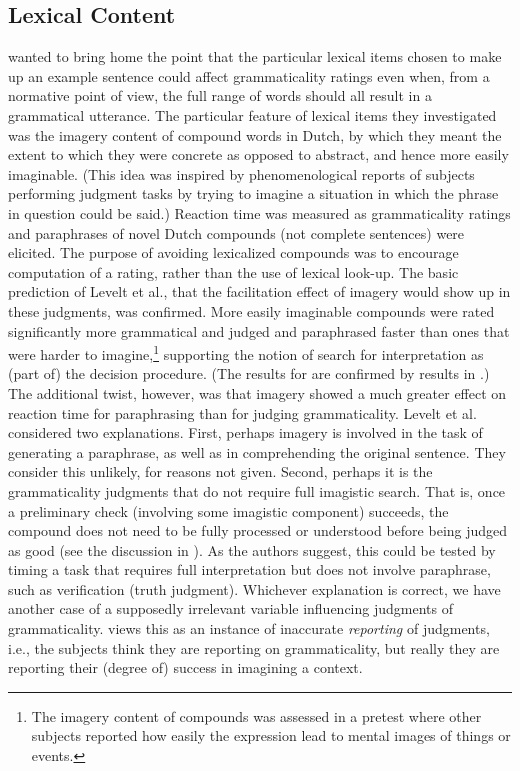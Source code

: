 \subsection{Lexical Content}\label{sec:5.3.5} 

\citet{LeveltEtAl1977} wanted to bring home the point that the particular lexical items chosen to make up an example sentence could affect grammaticality
ratings even when, from a normative point of view, the full range of words should all result in a grammatical utterance. The particular feature of lexical items they investigated was the imagery content of compound words in Dutch, by which they meant the extent to which they were concrete as opposed to abstract, and hence more easily imaginable. (This idea was inspired by phenomenological reports of subjects performing judgment tasks by trying to imagine a situation in which the phrase in question could be said.) Reaction time was measured as grammaticality ratings and paraphrases of novel Dutch compounds (not complete sentences) were elicited. The purpose of avoiding lexicalized compounds was to encourage computation of a rating, rather than the use of lexical look-up. The basic prediction of Levelt et al., that the facilitation effect of imagery would show up in these judgments, was confirmed. More easily imaginable compounds were rated significantly more grammatical and judged and paraphrased faster than ones that were harder to imagine,\footnote{The imagery content of compounds was assessed in a pretest where other subjects reported how easily the expression lead to mental images of things or events.}
 supporting the notion of search for interpretation as (part of) the decision procedure. (The results for  are confirmed by results in \citet{GrantEtAl1977}.)
 The additional twist, however, was that imagery showed a much greater effect on reaction time for paraphrasing than for judging grammaticality. Levelt et al. considered two explanations. First, perhaps imagery is involved in the task of generating a paraphrase, as well as in comprehending the original sentence. They consider this unlikely, for reasons not given. Second, perhaps it is the grammaticality judgments that do not require full imagistic search. That is, once a preliminary check (involving some imagistic component) succeeds, the compound does not need to be fully processed or understood before being judged as good (see the discussion in ). As the authors suggest, this could be tested by timing a task that requires full interpretation but does not involve paraphrase, such as verification (truth judgment). Whichever explanation is correct, we have another case of a supposedly irrelevant variable influencing judgments of grammaticality. \citet{McCawley1985} views this as an instance of inaccurate \textit{reporting} of judgments, i.e., the subjects think they are reporting on grammaticality, but really they are reporting their (degree of) success in imagining a context.

